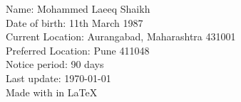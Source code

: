 \begin{center}

        Name: Mohammed Laeeq Shaikh\\
        
        Date of birth: 11th March 1987\\
        
        
        Current Location: Aurangabad, Maharashtra 431001\\
        
        Preferred Location: Pune 411048\\
        
        Notice period: 90 days\\
        \vspace{3mm}
        Last update: \today \\
        \vspace{3mm}
        Made with \large {} \space in \LaTeX \space \\%

\end{center}